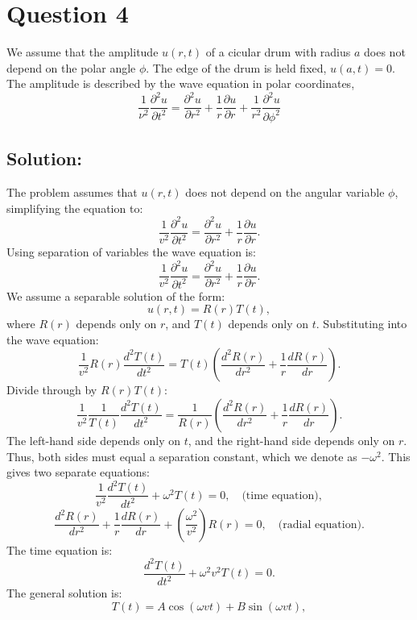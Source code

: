 \documentclass[12pt]{article}
\begin{document}
\section*{Question 4}
    We assume that the amplitude $u(r,t)$ of a cicular drum with radius $a$ does not depend on the polar angle $\phi$. The edge of the drum is held fixed, $u(a,t) = 0$. The amplitude is described by the wave equation in polar coordinates,
    \[
        \frac{1}{\nu^2} \frac{\partial^2 u}{\partial t^2} = \frac{\partial^2 u}{\partial r^2} + \frac{1}{r} \frac{\partial u}{\partial r} + \frac{1}{r^2} \frac{\partial^2 u}{\partial \phi^2}
    \]
    
    \subsection*{Solution:}
        The problem assumes that \( u(r, t) \) does not depend on the angular variable \( \phi \), simplifying the equation to:
        \[
        \frac{1}{v^2} \frac{\partial^2 u}{\partial t^2} = \frac{\partial^2 u}{\partial r^2} + \frac{1}{r} \frac{\partial u}{\partial r}.
        \]
        Using separation of variables the wave equation is:
        \[
        \frac{1}{v^2} \frac{\partial^2 u}{\partial t^2} = \frac{\partial^2 u}{\partial r^2} + \frac{1}{r} \frac{\partial u}{\partial r}.
        \]
        We assume a separable solution of the form:
        \[
        u(r, t) = R(r) T(t),
        \]
        where \( R(r) \) depends only on \( r \), and \( T(t) \) depends only on \( t \). Substituting into the wave equation:
        \[
        \frac{1}{v^2} R(r) \frac{d^2 T(t)}{dt^2} = T(t) \left( \frac{d^2 R(r)}{dr^2} + \frac{1}{r} \frac{dR(r)}{dr} \right).
        \]
        Divide through by \( R(r) T(t) \):
        \[
        \frac{1}{v^2} \frac{1}{T(t)} \frac{d^2 T(t)}{dt^2} = \frac{1}{R(r)} \left( \frac{d^2 R(r)}{dr^2} + \frac{1}{r} \frac{dR(r)}{dr} \right).
        \]
        The left-hand side depends only on \( t \), and the right-hand side depends only on \( r \). Thus, both sides must equal a separation constant, which we denote as \( -\omega^2 \). This gives two separate equations:
        \[
        \frac{1}{v^2} \frac{d^2 T(t)}{dt^2} + \omega^2 T(t) = 0, \quad \text{(time equation)},
        \]
        \[
        \frac{d^2 R(r)}{dr^2} + \frac{1}{r} \frac{dR(r)}{dr} + \left( \frac{\omega^2}{v^2} \right) R(r) = 0, \quad \text{(radial equation)}.
        \]
        The time equation is:
        \[
        \frac{d^2 T(t)}{dt^2} + \omega^2 v^2 T(t) = 0.
        \]
        The general solution is:
        \[
        T(t) = A \cos(\omega v t) + B \sin(\omega v t),
        \]
\end{document}
